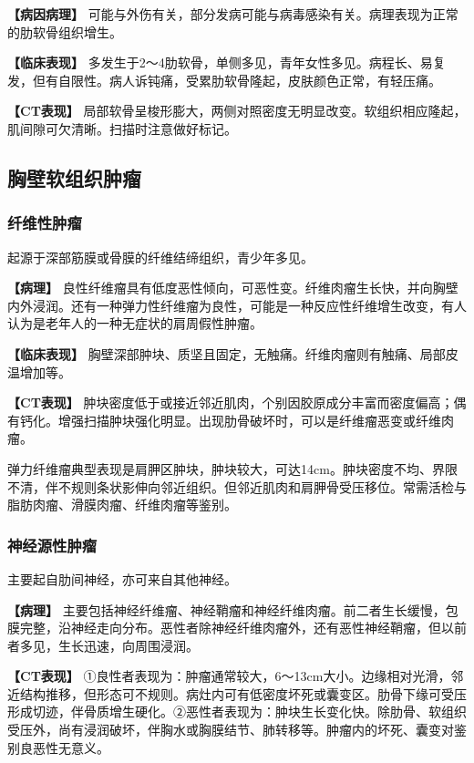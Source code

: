 \textbf{【病因病理】}
可能与外伤有关，部分发病可能与病毒感染有关。病理表现为正常的肋软骨组织增生。

\textbf{【临床表现】}
多发生于2～4肋软骨，单侧多见，青年女性多见。病程长、易复发，但有自限性。病人诉钝痛，受累肋软骨隆起，皮肤颜色正常，有轻压痛。

\textbf{【CT表现】}
局部软骨呈梭形膨大，两侧对照密度无明显改变。软组织相应隆起，肌间隙可欠清晰。扫描时注意做好标记。

\subsection{胸壁软组织肿瘤}

\subsubsection{纤维性肿瘤}

起源于深部筋膜或骨膜的纤维结缔组织，青少年多见。

\textbf{【病理】}
良性纤维瘤具有低度恶性倾向，可恶性变。纤维肉瘤生长快，并向胸壁内外浸润。还有一种弹力性纤维瘤为良性，可能是一种反应性纤维增生改变，有人认为是老年人的一种无症状的肩周假性肿瘤。

\textbf{【临床表现】}
胸壁深部肿块、质坚且固定，无触痛。纤维肉瘤则有触痛、局部皮温增加等。

\textbf{【CT表现】}
肿块密度低于或接近邻近肌肉，个别因胶原成分丰富而密度偏高；偶有钙化。增强扫描肿块强化明显。出现肋骨破坏时，可以是纤维瘤恶变或纤维肉瘤。

弹力纤维瘤典型表现是肩胛区肿块，肿块较大，可达14cm。肿块密度不均、界限不清，伴不规则条状影伸向邻近组织。但邻近肌肉和肩胛骨受压移位。常需活检与脂肪肉瘤、滑膜肉瘤、纤维肉瘤等鉴别。

\subsubsection{神经源性肿瘤}

主要起自肋间神经，亦可来自其他神经。

\textbf{【病理】}
主要包括神经纤维瘤、神经鞘瘤和神经纤维肉瘤。前二者生长缓慢，包膜完整，沿神经走向分布。恶性者除神经纤维肉瘤外，还有恶性神经鞘瘤，但以前者多见，生长迅速，向周围浸润。

\textbf{【CT表现】}
①良性者表现为：肿瘤通常较大，6～13cm大小。边缘相对光滑，邻近结构推移，但形态可不规则。病灶内可有低密度坏死或囊变区。肋骨下缘可受压形成切迹，伴骨质增生硬化。②恶性者表现为：肿块生长变化快。除肋骨、软组织受压外，尚有浸润破坏，伴胸水或胸膜结节、肺转移等。肿瘤内的坏死、囊变对鉴别良恶性无意义。

